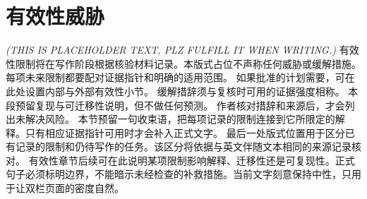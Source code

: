\section{有效性威胁}\label{sec:threats-to-validity}
\textit{(THIS IS PLACEHOLDER TEXT, PLZ FULFILL IT WHEN WRITING.)}
有效性限制将在写作阶段根据核验材料记录。本版式占位不声称任何威胁或缓解措施。
每项未来限制都要配对证据指针和明确的适用范围。
如果批准的计划需要，可在此处设置内部与外部有效性小节。
缓解措辞须与复核时可用的证据强度相称。
本段预留复现与可迁移性说明，但不做任何预测。
作者核对措辞和来源后，才会列出未解决风险。
本节预留一句收束语，把每项记录的限制连接到它所限定的解释。只有相应证据指针可用时才会补入正式文字。
最后一处版式位置用于区分已有记录的限制和仍待写作的任务。该区分将依据与英文伴随文本相同的来源记录核对。
有效性章节后续可在此说明某项限制影响解释、迁移性还是可复现性。正式句子必须标明边界，不能暗示未经检查的补救措施。当前文字刻意保持中性，只用于让双栏页面的密度自然。
